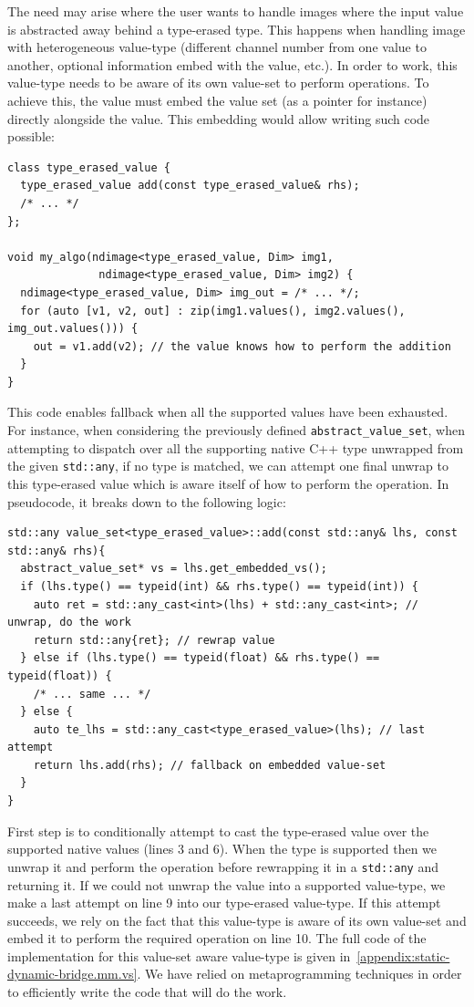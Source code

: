 The need may arise where the user wants to handle images where the input value is abstracted away behind a type-erased
type. This happens when handling image with heterogeneous value-type (different channel number from one value to
another, optional information embed with the value, etc.). In order to work, this value-type needs to be aware of its
own value-set  to perform operations. To achieve this, the value must embed the value set (as a pointer for instance)
directly alongside the value. This embedding would allow writing such code possible:
\begin{verbatim}
class type_erased_value {
  type_erased_value add(const type_erased_value& rhs);
  /* ... */
};

void my_algo(ndimage<type_erased_value, Dim> img1,
              ndimage<type_erased_value, Dim> img2) {
  ndimage<type_erased_value, Dim> img_out = /* ... */;
  for (auto [v1, v2, out] : zip(img1.values(), img2.values(), img_out.values())) {
    out = v1.add(v2); // the value knows how to perform the addition
  }
}
\end{verbatim}

This code enables fallback when all the supported values have been exhausted. For instance, when considering the
previously defined \texttt{abstract\_value\_set}, when attempting to dispatch over all the supporting native C++ type
unwrapped from the given \texttt{std::any}, if no type is matched, we can attempt one final unwrap to this type-erased
value which is aware itself of how to perform the operation. In pseudocode, it breaks down to the following logic:
\begin{verbatim}
std::any value_set<type_erased_value>::add(const std::any& lhs, const std::any& rhs){
  abstract_value_set* vs = lhs.get_embedded_vs();
  if (lhs.type() == typeid(int) && rhs.type() == typeid(int)) {
    auto ret = std::any_cast<int>(lhs) + std::any_cast<int>; // unwrap, do the work
    return std::any{ret}; // rewrap value
  } else if (lhs.type() == typeid(float) && rhs.type() == typeid(float)) {
    /* ... same ... */
  } else {
    auto te_lhs = std::any_cast<type_erased_value>(lhs); // last attempt
    return lhs.add(rhs); // fallback on embedded value-set
  }
}
\end{verbatim}
First step is to conditionally attempt to cast the type-erased value over the supported native values (lines 3 and 6).
When the type is supported then we unwrap it and perform the operation before rewrapping it in a \texttt{std::any} and
returning it. If we could not unwrap the value into a supported value-type, we make a last attempt on line 9 into our
type-erased value-type. If this attempt succeeds, we rely on the fact that this value-type is aware of its own value-set
and embed it to perform the required operation on line 10. The full code of the implementation for this value-set aware
value-type is given in~\cref{appendix:static-dynamic-bridge.mm.vs}. We have relied on metaprogramming techniques in
order to efficiently write the code that will do the work.

